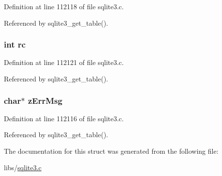 Definition at line 112118 of file sqlite3.\+c.



Referenced by sqlite3\+\_\+get\+\_\+table().

\hypertarget{struct_tab_result_ac6509c6fe4cbf7bde170597172f8a288}{}
\subsubsection[{rc}]{\setlength{\rightskip}{0pt plus 5cm}int rc}\label{struct_tab_result_ac6509c6fe4cbf7bde170597172f8a288}


Definition at line 112121 of file sqlite3.\+c.



Referenced by sqlite3\+\_\+get\+\_\+table().

\hypertarget{struct_tab_result_a6fcf95fd4e53f09793171bd5b704ac9a}{}
\subsubsection[{z\+Err\+Msg}]{\setlength{\rightskip}{0pt plus 5cm}char$\ast$ z\+Err\+Msg}\label{struct_tab_result_a6fcf95fd4e53f09793171bd5b704ac9a}


Definition at line 112116 of file sqlite3.\+c.



Referenced by sqlite3\+\_\+get\+\_\+table().



The documentation for this struct was generated from the following file\+:\begin{DoxyCompactItemize}
\item 
libs/\hyperlink{sqlite3_8c}{sqlite3.\+c}\end{DoxyCompactItemize}
